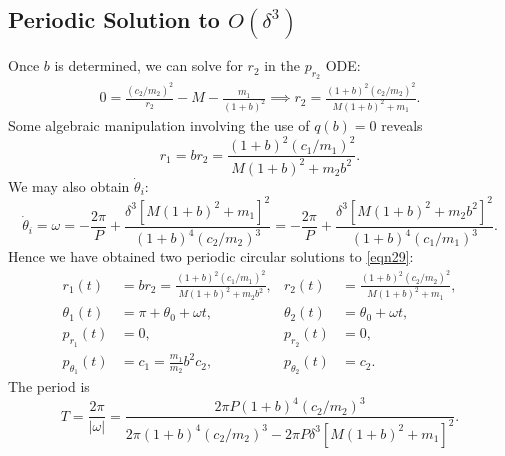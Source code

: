 \documentclass[12pt]{article}
\begin{document}
\subsection{Periodic Solution to $O(\delta^3)$}
Once $b$ is determined, we can solve for $r_2$ in the $p_{r_2}$ ODE:
\begin{align*}
0 = \frac{(c_2/m_2)^2}{r_2} - M - \frac{m_1}{(1+b)^2} %
\implies r_2 = \frac{(1+b)^2(c_2/m_2)^2}{M(1+b)^2 + m_1}.
\end{align*}
Some algebraic manipulation involving the use of $q(b) = 0$ reveals
\begin{equation*}
    r_1 = br_2 = \frac{(1+b)^2(c_1/m_1)^2}{M(1+b)^2 + m_2b^2}.
\end{equation*}
We may also obtain $\dot{\theta}_i$:
\begin{equation}
\dot{\theta}_i = \omega = -\frac{2\pi}{P} + \frac{\delta^3[M(1+b)^2 + m_1]^2}{(1+b)^4(c_2/m_2)^3} = -\frac{2\pi}{P} + \frac{\delta^3[M(1+b)^2 + m_2b^2]^2}{(1+b)^4(c_1/m_1)^3}.
\end{equation}
Hence we have obtained two periodic circular solutions to \eqref{eqn29}:
\begin{align}
r_1(t) & = br_2 = \frac{(1+b)^2(c_1/m_1)^2}{M(1+b)^2 + m_2b^2}, & r_2(t) & = \frac{(1+b)^2(c_2/m_2)^2}{M(1+b)^2 + m_1},\nonumber\\
\theta_1(t) & = \pi + \theta_0 + \omega t, & \theta_2(t) & = \theta_0 + \omega t, \nonumber\\
p_{r_1}(t) & = 0, & p_{r_2}(t) & = 0, \nonumber\\
p_{\theta_1}(t) & = c_1 = \frac{m_1}{m_2}b^2c_2, & p_{\theta_2}(t) & = c_2.
\label{eqn34}
\end{align}
The period is
\[ T = \frac{2\pi}{\vert\omega\vert} = \frac{ 2\pi P (1+b)^4(c_2/m_2)^3}{2\pi(1+b)^4(c_2/m_2)^3 -2\pi P \delta^3[M(1+b)^2+m_1]^2}.\]
\end{document}
